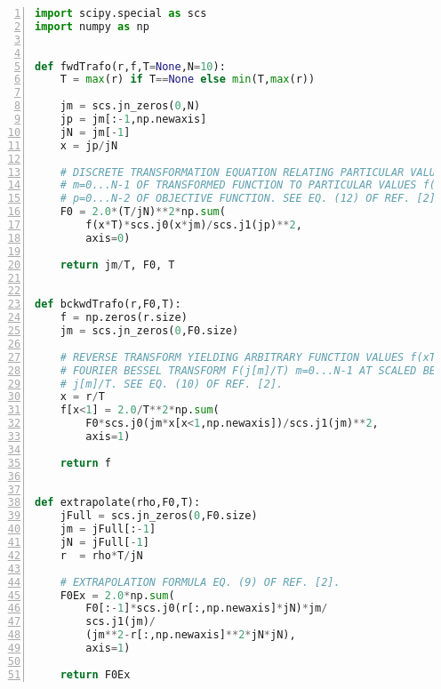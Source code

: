 \documentclass[12pt]{iopart}
\begin{document}
\begin{lstlisting}[float, floatplacement=H, numbers=left, captionpos=b,keywordstyle=\bf, frame=lines, language=Python,basicstyle=\ttfamily\scriptsize, caption={Implementation of the discrete Fourier Bessel Transform of order zero (aka Hankel transform) for a continuous objective function in {\tt{python}} module file {\tt{dFBT.py}}. The algorithmic procedure follows the method detailed in Ref.\ \cite{FiskJohnson:1987}.}, label=code:dFBT]
import scipy.special as scs
import numpy as np 


def fwdTrafo(r,f,T=None,N=10):
    T = max(r) if T==None else min(T,max(r))

    jm = scs.jn_zeros(0,N)
    jp = jm[:-1,np.newaxis]
    jN = jm[-1]
    x = jp/jN

    # DISCRETE TRANSFORMATION EQUATION RELATING PARTICULAR VALUES F(j[m]/T) 
    # m=0...N-1 OF TRANSFORMED FUNCTION TO PARTICULAR VALUES f(x[p] T) 
    # p=0...N-2 OF OBJECTIVE FUNCTION. SEE EQ. (12) OF REF. [2].
    F0 = 2.0*(T/jN)**2*np.sum(
        f(x*T)*scs.j0(x*jm)/scs.j1(jp)**2,
        axis=0)

    return jm/T, F0, T 


def bckwdTrafo(r,F0,T):
    f = np.zeros(r.size)
    jm = scs.jn_zeros(0,F0.size)
    
    # REVERSE TRANSFORM YIELDING ARBITRARY FUNCTION VALUES f(xT) FROM ITS 
    # FOURIER BESSEL TRANSFORM F(j[m]/T) m=0...N-1 AT SCALED BESSEL ZEROS 
    # j[m]/T. SEE EQ. (10) OF REF. [2].
    x = r/T
    f[x<1] = 2.0/T**2*np.sum(
        F0*scs.j0(jm*x[x<1,np.newaxis])/scs.j1(jm)**2, 
        axis=1)

    return f


def extrapolate(rho,F0,T):
    jFull = scs.jn_zeros(0,F0.size)
    jm = jFull[:-1]
    jN = jFull[-1] 
    r  = rho*T/jN 
    
    # EXTRAPOLATION FORMULA EQ. (9) OF REF. [2].
    F0Ex = 2.0*np.sum(
        F0[:-1]*scs.j0(r[:,np.newaxis]*jN)*jm/
        scs.j1(jm)/
        (jm**2-r[:,np.newaxis]**2*jN*jN),
        axis=1)

    return F0Ex
\end{lstlisting}
\end{document}
